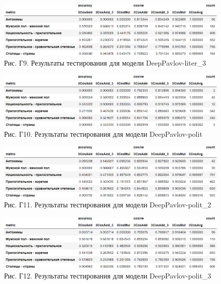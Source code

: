 \documentclass[a4paper,14pt]{article}
\begin{document}
\begin{figure}[H]
	\centering
	\includegraphics[width=0.9\linewidth]{image/res_DeepPavlov-liter_3 }
	\caption*{Рис. Г9. Результаты тестирования для модели DeepPavlov-liter\_3 }
	\label{fig:resDeepPavlov-liter3 }
\end{figure}

\begin{figure}[H]
	\centering
	\includegraphics[width=0.9\linewidth]{image/res_DeepPavlov-polit }
	\caption*{Рис. Г10. Результаты тестирования для модели DeepPavlov-polit }
	\label{fig:resDeepPavlov-polit }
\end{figure}

\begin{figure}[H]
	\centering
	\includegraphics[width=0.9\linewidth]{image/res_DeepPavlov-polit_2 }
	\caption*{Рис. Г11. Результаты тестирования для модели DeepPavlov-polit\_2 }
	\label{fig:resDeepPavlov-polit2 }
\end{figure}

\begin{figure}[H]
	\centering
	\includegraphics[width=0.9\linewidth]{image/res_DeepPavlov-polit_3 }
	\caption*{Рис. Г12. Результаты тестирования для модели DeepPavlov-polit\_3 }
	\label{fig:resDeepPavlov-polit3 }
\end{figure}
\end{document}
